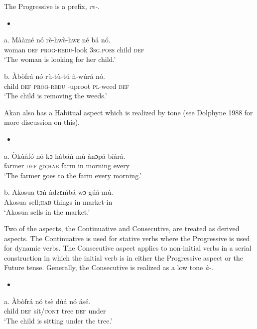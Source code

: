 \documentclass[output=paper]{langsci/langscibook}
\begin{document}
The Progressive is a prefix, \emph{re-}.

\begin{itemize}
\item \end{itemize}
\gll \textup{a.  }M\`{a}\`{a}m\'{e}   n\'{o}  r\`{e}-hw\`{e}-hwɛ     n\'{e}    b\'{a}   n\'{o}.\\
       woman    \textsc{def}  \textsc{prog-redu}{}-look  \textsc{3sg.poss}  child  \textsc{def}\\
\glt ‘The woman is looking for her child.’
\z

\gll b.  \`{A}b\`{o}fr\'{a}  n\'{o}  r\`{u}-t\`{u}-t\'{u}    \`{n}-w\'{u}r\'{a}    n\'{o}.\\
       child  \textsc{def}  \textsc{prog-redu} -uproot  \textsc{pl}{}-weed  \textsc{def}\\
\glt ‘The child is removing the weeds.’
\z

Akan also has a Habitual aspect which is realized by tone (see Dolphyne 1988 for more discussion on this).

\begin{itemize}
\item \end{itemize}
\gll a.  \`{O}k\`{u}\`{a}f\'{o}  n\'{o}   kɔ    h\`{a}b\'{a}\'{n}  m\`{u}  \`{a}nɔp\'{a}    b\'{i}\'{a}r\'{a}.\\
       farmer  \textsc{def}  go;\textsc{hab}    farm  in  morning  every\\
\glt ‘The farmer goes to the farm every morning.’
\z

\gll b.  Akosua    tɔ\`{n}     \`{n}dzɛ\'{m}b\'{a}  wɔ  g\'{u}\'{a}-m\'{u}.\\
       Akosua  sell;\textsc{hab}  things    in  market-in\\
\glt ‘Akosua sells in the market.’
\z

Two of the aspects, the Continuative and Consecutive, are treated as derived aspects. The Continuative is used for stative verbs where the Progressive is used for dynamic verbs. The Consecutive aspect applies to non-initial verbs in a serial construction in which the initial verb is in either the Progressive aspect or the Future tense. Generally, the Consecutive is realized as a low tone \emph{à-}.

\begin{itemize}
\item \end{itemize}
\gll a.  \`{A}b\`{o}fr\'{a}  n\'{o}  ts\`{e}    d\`{u}\'{a}  n\'{o}  \'{a}s\'{e}.\\
       child  \textsc{def}  sit/\textsc{cont}  tree  \textsc{def}  under\\
\glt ‘The child is sitting under the tree.’
\z
\end{document}

